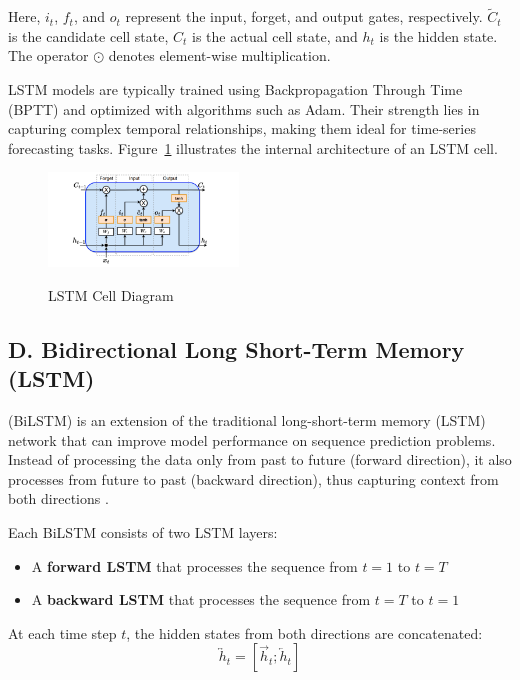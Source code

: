\documentclass{ifacconf}
\begin{document}
Here, $i_t$, $f_t$, and $o_t$ represent the input, forget, and output gates, respectively. $\tilde{C}_t$ is the candidate cell state, $C_t$ is the actual cell state, and $h_t$ is the hidden state. The operator $\odot$ denotes element-wise multiplication.

LSTM models are typically trained using Backpropagation Through Time (BPTT) and optimized with algorithms such as Adam. Their strength lies in capturing complex temporal relationships, making them ideal for time-series forecasting tasks. Figure~\ref{fig:lstm} illustrates the internal architecture of an LSTM cell.\cite{hochreiter1997long}

\begin{figure}[h]
  \centering
  \includegraphics[width=0.45\textwidth]{lstm.png}
  \caption{LSTM Cell Diagram}
  \label{fig:lstm}
  \cite{hochreiter1997long}
\end{figure}

\subsection{D. Bidirectional Long Short-Term Memory (LSTM)}
(BiLSTM) is an extension of the traditional long-short-term memory (LSTM) network that can improve model performance on sequence prediction problems. Instead of processing the data only from past to future (forward direction), it also processes from future to past (backward direction), thus capturing context from both directions \cite{schuster1997bidirectional}.

\vspace{1em}
Each BiLSTM consists of two LSTM layers:
\begin{itemize}
    \item A \textbf{forward LSTM} that processes the sequence from $t = 1$ to $t = T$
    \item A \textbf{backward LSTM} that processes the sequence from $t = T$ to $t = 1$
\end{itemize}

At each time step $t$, the hidden states from both directions are concatenated:
\[
\overleftrightarrow{h}_t = [\overrightarrow{h}_t; \overleftarrow{h}_t]
\]
\end{document}
